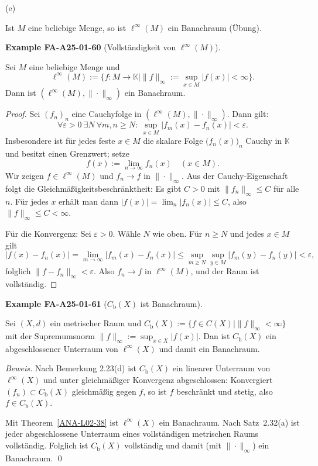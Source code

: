 \documentclass[10pt, letterpaper]{article}
\newcommand{\CustomHeading}[3]{%
  \par\medskip\noindent%
  \textbf{#1 #2} \textnormal{(#3)}.\enskip%
}
\newenvironment{EXA}[2]{\begin{unitbox}\CustomHeading{Example}{#1}{#2}}{\end{unitbox}}
\begin{document}
(e) 


Ist $M$ eine beliebige Menge, so ist $\ell^{\infty}(M)$ ein Banachraum (Übung).



\begin{EXA}{FA-A25-01-60}{Vollständigkeit von $\ell^{\infty}(M)$}
Sei $M$ eine beliebige Menge und
\[
\ell^{\infty}(M):=\{f:M\to\mathbb{K}\mid \|f\|_{\infty}:=\sup_{x\in M}|f(x)|<\infty\}.
\]
Dann ist $(\ell^{\infty}(M),\|\cdot\|_{\infty})$ ein Banachraum.

\begin{proof}
Sei $(f_n)_{n}$ eine Cauchyfolge in $(\ell^{\infty}(M),\|\cdot\|_{\infty})$. Dann gilt:
\[
\forall \varepsilon>0\ \exists N\ \forall m,n\ge N:\ \sup_{x\in M}|f_m(x)-f_n(x)|<\varepsilon.
\]
Insbesondere ist für jedes feste $x\in M$ die skalare Folge $\bigl(f_n(x)\bigr)_n$ Cauchy in $\mathbb{K}$ und besitzt einen Grenzwert; setze
\[
f(x):=\lim_{n\to\infty} f_n(x)\quad (x\in M).
\]
Wir zeigen $f\in\ell^{\infty}(M)$ und $f_n\to f$ in $\|\cdot\|_{\infty}$.  
Aus der Cauchy-Eigenschaft folgt die Gleichmäßigkeitsbeschränktheit: Es gibt $C>0$ mit $\|f_n\|_{\infty}\le C$ für alle $n$. Für jedes $x$ erhält man dann $|f(x)|=\lim_{n}|f_n(x)|\le C$, also $\|f\|_{\infty}\le C<\infty$.

Für die Konvergenz: Sei $\varepsilon>0$. Wähle $N$ wie oben. Für $n\ge N$ und jedes $x\in M$ gilt
\[
|f(x)-f_n(x)|=\lim_{m\to\infty}|f_m(x)-f_n(x)|\le \sup_{m\ge N}\sup_{y\in M}|f_m(y)-f_n(y)|<\varepsilon,
\]
folglich $\|f-f_n\|_{\infty}<\varepsilon$. Also $f_n\to f$ in $\ell^{\infty}(M)$, und der Raum ist vollständig.
\end{proof}
\end{EXA}


\begin{EXA}{FA-A25-01-61}{$C_{\mathrm{b}}(X)$ ist Banachraum}
Sei $(X,d)$ ein metrischer Raum und $C_{\mathrm{b}}(X):=\{f\in C(X)\mid \|f\|_\infty<\infty\}$ mit der Supremumsnorm $\|f\|_\infty:=\sup_{x\in X}|f(x)|$. Dan ist $C_{\mathrm{b}}(X)$ ein abgeschlossener Unterraum von $\ell^\infty(X)$ und damit ein Banachraum.

\emph{Beweis.}  
Nach Bemerkung 2.23(d) ist $C_{\mathrm{b}}(X)$ ein linearer Unterraum von $\ell^\infty(X)$ und unter gleichmäßiger Konvergenz abgeschlossen: Konvergiert $(f_n)\subset C_{\mathrm{b}}(X)$ gleichmäßig gegen $f$, so ist $f$ beschränkt und stetig, also $f\in C_{\mathrm{b}}(X)$. 

Mit Theorem~\ref{ANA-L02-38} ist $\ell^\infty(X)$ ein Banachraum. Nach Satz~2.32(a) ist jeder abgeschlossene Unterraum eines vollständigen metrischen Raums vollständig. Folglich ist $C_{\mathrm{b}}(X)$ vollständig und damit (mit $\|\cdot\|_\infty$) ein Banachraum. \qed
\end{EXA}
\end{document}

